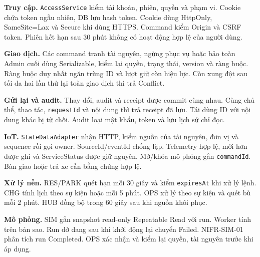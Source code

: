 \begingroup
\setlength{\parskip}{3pt}
\noindent\textbf{Truy cập.} \texttt{AccessService} kiểm tài khoản, phiên, quyền và phạm vi. Cookie chứa token ngẫu nhiên, DB lưu hash token. Cookie dùng HttpOnly, SameSite=Lax và Secure khi dùng HTTPS. Command kiểm Origin và CSRF token. Phiên hết hạn sau 30 phút không có hoạt động hợp lệ của người dùng.

\noindent\textbf{Giao dịch.} Các command tranh tài nguyên, ngừng phục vụ hoặc bảo toàn Admin cuối dùng Serializable, kiểm lại quyền, trạng thái, version và ràng buộc. Ràng buộc duy nhất ngăn trùng ID và lượt giữ còn hiệu lực. Còn xung đột sau tối đa hai lần thử lại toàn giao dịch thì trả Conflict.

\noindent\textbf{Gửi lại và audit.} Thay đổi, audit và receipt được commit cùng nhau. Cùng chủ thể, thao tác, \texttt{requestId} và nội dung thì trả receipt đã lưu. Tái dùng ID với nội dung khác bị từ chối. Audit loại mật khẩu, token và lưu lịch sử chỉ đọc.

\noindent\textbf{IoT.} \texttt{StateDataAdapter} nhận HTTP, kiểm nguồn của tài nguyên, đơn vị và sequence rồi gọi owner. SourceId/eventId chống lặp. Telemetry hợp lệ, mới hơn được ghi và ServiceStatus được giữ nguyên. Mở/khóa mô phỏng gắn \texttt{commandId}. Bàn giao hoặc trả xe cần bằng chứng hợp lệ.

\noindent\textbf{Xử lý nền.} RES/PARK quét hạn mỗi 30 giây và kiểm \texttt{expiresAt} khi xử lý lệnh. CHG tính lịch theo sự kiện hoặc mỗi 5 phút. OPS xử lý theo sự kiện và quét bù mỗi 2 phút. HUB đồng bộ trong 60 giây sau khi nguồn khôi phục.

\noindent\textbf{Mô phỏng.} SIM gắn snapshot read-only Repeatable Read với run. Worker tính trên bản sao. Run dở dang sau khi khởi động lại chuyển Failed. NIFR-SIM-01 phân tích run Completed. OPS xác nhận và kiểm lại quyền, tài nguyên trước khi áp dụng.

\endgroup
